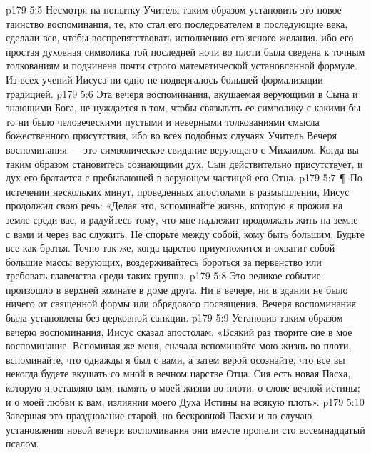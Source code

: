 \vs p179 5:5 Несмотря на попытку Учителя таким образом установить это новое таинство воспоминания, те, кто стал его последователем в последующие века, сделали все, чтобы воспрепятствовать исполнению его ясного желания, ибо его простая духовная символика той последней ночи во плоти была сведена к точным толкованиям и подчинена почти строго математической установленной формуле. Из всех учений Иисуса ни одно не подвергалось большей формализации традицией.
\vs p179 5:6 Эта вечеря воспоминания, вкушаемая верующими в Сына и знающими Бога, не нуждается в том, чтобы связывать ее символику с какими бы то ни было человеческими пустыми и неверными толкованиями смысла божественного присутствия, ибо во всех подобных случаях Учитель  Вечеря воспоминания --- это символическое свидание верующего с Михаилом. Когда вы таким образом становитесь сознающими дух, Сын действительно присутствует, и дух его братается с пребывающей в верующем частицей его Отца.
\vs p179 5:7 \P\ По истечении нескольких минут, проведенных апостолами в размышлении, Иисус продолжил свою речь: «Делая это, вспоминайте жизнь, которую я прожил на земле среди вас, и радуйтесь тому, что мне надлежит продолжать жить на земле с вами и через вас служить. Не спорьте между собой, кому быть большим. Будьте все как братья. Точно так же, когда царство приумножится и охватит собой большие массы верующих, воздерживайтесь бороться за первенство или требовать главенства среди таких групп».
\vs p179 5:8 Это великое событие произошло в верхней комнате в доме друга. Ни в вечере, ни в здании не было ничего от священной формы или обрядового посвящения. Вечеря воспоминания была установлена без церковной санкции.
\vs p179 5:9 Установив таким образом вечерю воспоминания, Иисус сказал апостолам: «Всякий раз творите сие в мое воспоминание. Вспоминая же меня, сначала вспоминайте мою жизнь во плоти, вспоминайте, что однажды я был с вами, а затем верой осознайте, что все вы некогда будете вкушать со мной в вечном царстве Отца. Сия есть новая Пасха, которую я оставляю вам, память о моей жизни во плоти, о слове вечной истины; и о моей любви к вам, излиянии моего Духа Истины на всякую плоть».
\vs p179 5:10 Завершая это празднование старой, но бескровной Пасхи и по случаю установления новой вечери воспоминания они вместе пропели сто восемнадцатый псалом.
